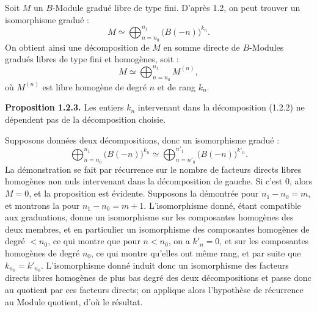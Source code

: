 Soit \(M\) un \(B\)-Module gradué libre de type fini. D'après 1.2, on peut trouver un isomorphisme gradué :
\begin{equation}\tag{1.2.2}
  M\simeq \bigoplus_{n=n_0}^{n_1} \bigl(B(-n)\bigr)^{k_n}.
\end{equation}
On obtient ainsi une décomposition de \(M\) en somme directe de \(B\)-Modules gradués libres de type fini et homogènes, soit :
\[
  M\simeq \bigoplus_{n=n_0}^{n_1}M^{(n)},
\]
où \(M^{(n)}\) est libre homogène de degré \(n\) et de rang \(k_n\).

\textbf{Proposition 1.2.3.} Les entiers \(k_n\) intervenant dans la décomposition (1.2.2) ne dépendent pas de la décomposition choisie.

Supposons données deux décompositions, donc un isomorphisme gradué :
\[
  \bigoplus_{n=n_0}^{n_1}\bigl(B(-n)\bigr)^{k_n}\simeq
  \bigoplus_{n=n'_0}^{n'_1}\bigl(B(-n)\bigr)^{k'_n}.
\]
La démonstration se fait par récurrence sur le nombre de facteurs directs libres homogènes non nuls intervenant dans la décomposition de gauche. Si c'est \(0\), alors \(M=0\), et la proposition est évidente. Supposons la démontrée pour \(n_1-n_0=m\), et montrons la pour \(n_1-n_0=m+1\). L'isomorphisme donné, étant compatible aux graduations, donne un isomorphisme sur les composantes homogènes des deux membres, et en particulier un isomorphisme des composantes homogènes de degré \(<n_0\), ce qui montre que pour \(n<n_0\), on a \(k'_n=0\), et sur les composantes homogènes de degré \(n_0\), ce qui montre qu'elles ont même rang, et par suite que \(k_{n_0}=k'_{n_0}\). L'isomorphisme donné induit donc un isomorphisme des facteurs directs libres homogènes de plus bas degré des deux décompositions et passe donc au quotient par ces facteurs directs; on applique alors l'hypothèse de récurrence au Module quotient, d'où le résultat.

